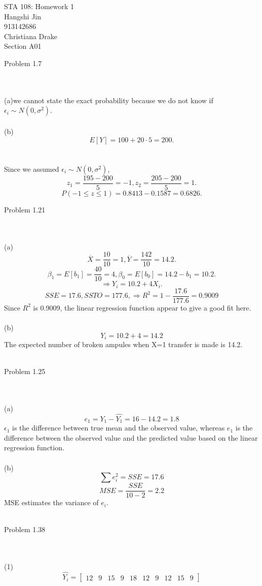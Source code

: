 \documentclass{article}
\begin{document}
\begin{flushright}STA 108: Homework 1\\ Hangshi Jin\\ 913142686\\ Christiana Drake\\ Section A01
\end{flushright}
\begin{large}Problem 1.7\end{large}
\\\\(a)we cannot state the exact probability because we do not know if $\epsilon_i\sim N(0,\sigma^2)$.
\\\\(b)\[E[Y]=100+20\cdot5=200.\]
\\\\Since we assumed  $\epsilon_i\sim N(0,\sigma^2)$, \[z_1=\frac{195-200}{5}=-1,z_2=\frac{205-200}{5}=1.\]
\[P(-1\leq z\leq 1)=0.8413-0.1587=0.6826.\]
\begin{large}Problem 1.21\end{large}
\\\\(a)\[\overline{X}=\frac{10}{10}=1,\overline{Y}=\frac{142}{10}=14.2.\]
\[\beta_1=E[b_1]=\frac{40}{10}=4,\beta_0=E[b_0]=14.2-b_1=10.2.\]
\[\Rightarrow Y_i=10.2+4X_i.\]
\[SSE=17.6,SSTO=177.6,\Rightarrow R^2=1-\frac{17.6}{177.6}=0.9009\]
Since $R^2$ is 0.9009, the linear regression function appear to give a good fit here.
\\\\(b)\[Y_i=10.2+4=14.2\]
The expected number of broken ampules when X=1 transfer is made is 14.2.
\\\\\begin{large}Problem 1.25\end{large}
\\\\(a)\[e_1=Y_1-\hat{Y_1}=16-14.2=1.8\]
$\epsilon_1$ is the difference between true mean and the observed value, whereas $e_1$ is the difference between the observed value and the predicted value based on the linear regression function.
\\\\(b)\[\sum{e^2_i}=SSE=17.6\]
\[MSE=\frac{SSE}{10-2}=2.2\]
MSE estimates the variance of $e_i$.
\\\\\begin{large}Problem 1.38\end{large}
\\\\(1)\[\hat{Y_i}=\begin{bmatrix}12&9&15& 9 &18& 12& 9& 12& 15& 9\end{bmatrix}\]
\end{document}
